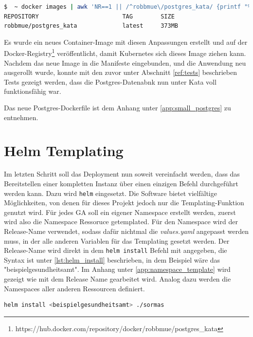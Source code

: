 \begin{lstlisting}[language=bash, caption={Größe des Debian Images}, label=lst:debian_postgres_size]
$  ~ docker images | awk 'NR==1 || /^robbmue\/postgres_kata/ {printf "%-33s %-10s %s\n", $1, $2, $NF}'
REPOSITORY                        TAG        SIZE
robbmue/postgres_kata             latest     373MB
\end{lstlisting}

Es wurde ein neues Container-Image mit diesen Anpassungen erstellt und auf der Docker-Registry\footnote{https://hub.docker.com/repository/docker/robbmue/postgres\_kata} veröffentlicht, damit Kubernetes sich dieses Image ziehen kann.
Nachdem das neue Image in die Manifeste eingebunden, und die Anwendung neu ausgerollt wurde, konnte mit den zuvor unter Abschnitt \ref{ref:tests} beschrieben Tests gezeigt werden, dass die Postgres-Datenabnk nun unter Kata voll funktionsfähig war.

Das neue Postgres-Dockerfile ist dem Anhang unter \ref{app:small_postgres} zu entnehmen.


\section{Helm Templating}
Im letzten Schritt soll das Deployment nun soweit vereinfacht werden, dass das Bereitstellen einer kompletten Instanz über einen einzigen Befehl durchgeführt werden kann.
Dazu wird \texttt{helm} eingesetzt. 
Die Software bietet vielfältige Möglichkeiten, von denen für dieses Projekt jedoch nur die Templating-Funktion genutzt wird.
Für jedes \ac{GA} soll ein eigener Namespace erstellt werden, zuerst wird also die Namespace Ressoruce getemplated.
Für den Namespace wird der Release-Name verwendet, sodass dafür nichtmal die \textit{values.yaml} angepasst werden muss, in der alle anderen Variablen für das Templating gesetzt werden. 
Der Release-Name wird direkt in dem \texttt{helm install} Befehl mit angegeben, die Syntax ist unter \ref{lst:helm_install} beschrieben, in dem Beispiel wäre das "beispielgesundheitsamt".
Im Anhang unter \ref{app:namespace_template} wird gezeigt wie mit dem Release Name gearbeitet wird. 
Analog dazu werden die Namespaces aller anderen Ressourcen definiert. 

\begin{lstlisting}[language=bash, caption={Syntax des \texttt{helm install} Kommanods}, label=lst:helm_install]
helm install <beispielgesundheitsamt> ./sormas
\end{lstlisting}

